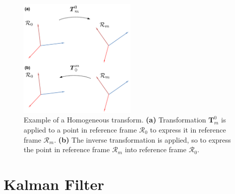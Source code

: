 \begin{figure}
    \centering
    \includegraphics[width=0.5\textwidth]{Images/fig15-homogeneous-transform.png}
    \caption[Example of a Homogeneous transform]{Example of a Homogeneous transform. \textbf{(a)} Transformation $\bm{T}_m^0$ is applied to a point in reference frame $\mathcal{R}_0$ to express it in reference frame $\mathcal{R}_m$. \textbf{(b)} The inverse transformation is applied, so to express the point in reference frame $\mathcal{R}_m$ into reference frame $\mathcal{R}_0$.  \cite{bona-dynamic-modelling}}
    \label{fig:chapter1:transform:homogeneous}
\end{figure}

\section{Kalman Filter}
\label{sec:chapter1:kf}
\nocite{intro-robotics}

